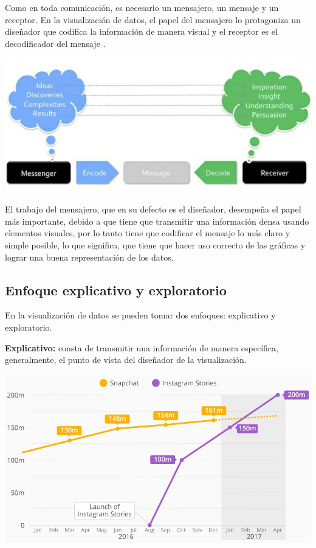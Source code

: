 Como en toda comunicación, es necesario un mensajero, un mensaje y un receptor. En la visualización de datos, el papel del mensajero lo protagoniza un diseñador que codifica la información de manera visual y el receptor es el decodificador del mensaje \cite{DataVis}.

\begin{center}
    \bigbreak
    \includegraphics[scale=0.45]{images/marco_teorico/flow_vis.png}
    \label{fig:marco_teorico_flow_vis}
    \bigbreak
\end{center}

El trabajo del mensajero, que en su defecto es el diseñador, desempeña el papel más importante, debido a que tiene que transmitir una información densa usando elementos visuales, por lo tanto tiene que codificar el mensaje lo más claro y simple posible, lo que significa, que tiene que hacer uso correcto de las gráficas y lograr una buena representación de los datos.

\subsection{Enfoque explicativo y exploratorio}
En la visualización de datos se pueden tomar dos enfoques: explicativo y exploratorio.

\textbf{Explicativo:} consta de transmitir una información de manera específica, generalmente, el punto de vista del diseñador de la visualización.

\begin{center}
    \bigbreak
    \includegraphics[scale=0.35]{images/marco_teorico/story_chart.png}
    \label{fig:marco_teorico_story_chart}
    \bigbreak
\end{center}

